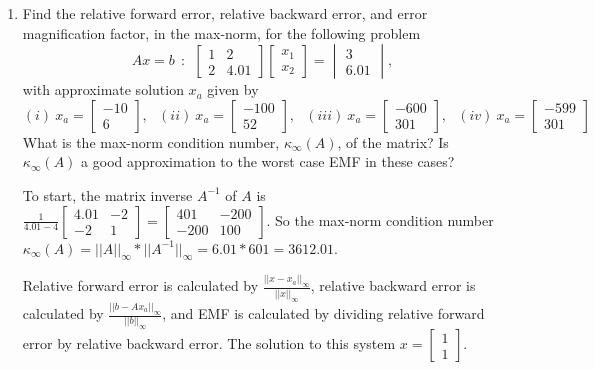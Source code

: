 \documentclass[10pt,letterpaper]{article}
\begin{document}
\begin{enumerate}
\begin{enumerate}
\end{enumerate}

\item Find the relative forward error, relative backward error, and error magnification factor, in the max-norm, for the following problem
$$Ax = b\ \ :\ \ \begin{bmatrix}
1 & 2 \\
2 & 4.01 
\end{bmatrix}\begin{bmatrix}
x_{1} \\
x_{2} 
\end{bmatrix} = \begin{vmatrix}
3 \\
6.01 
\end{vmatrix},$$
with approximate solution $x_{a}$ given by 
$$(i)\ x_{a} = \begin{bmatrix}
-10 \\
6 
\end{bmatrix},\ \ \ (ii)\ x_{a} = \begin{bmatrix}
-100 \\
52 
\end{bmatrix},\ \ \ (iii)\ x_{a} = \begin{bmatrix}
-600 \\
301 
\end{bmatrix},\ \ \ (iv)\ x_{a} = \begin{bmatrix}
-599 \\
301
\end{bmatrix}$$
What is the max-norm condition number, $\kappa_{\infty}(A)$, of the matrix? Is $\kappa_{\infty}(A)$ a good approximation to the worst case EMF in these cases? 

\color{TangGreen}
To start, the matrix inverse $A^{-1}$ of $A$ is $\frac{1}{4.01 - 4}\begin{bmatrix}
4.01 & -2 \\
-2 & 1 
\end{bmatrix} = \begin{bmatrix}
401 & -200 \\
-200 & 100
\end{bmatrix}$. So the max-norm condition number $\kappa_{\infty}(A) = ||A||_{\infty} * ||A^{-1}||_{\infty} = 6.01 * 601 = 3612.01$. 

Relative forward error is calculated by $\frac{||x - x_{a}||_{\infty}}{||x||_{\infty}}$, relative backward error is calculated by $\frac{||b - Ax_{a}||_{\infty}}{||b||_{\infty}}$, and EMF is calculated by dividing relative forward error by relative backward error. The solution to this system $x = \begin{bmatrix}
1 \\
1
\end{bmatrix}$.


\end{enumerate}
\end{document}
